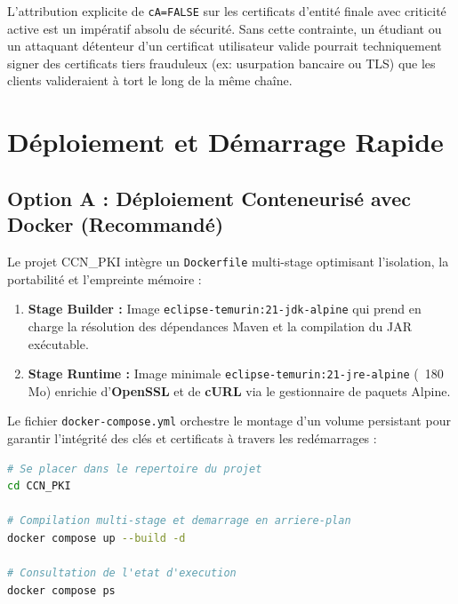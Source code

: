\documentclass[12pt,a4paper]{report}
\begin{document}
\begin{infobox}[title=Importance de l'extension BasicConstraints cA=FALSE]
L'attribution explicite de \texttt{cA=FALSE} sur les certificats d'entité finale avec criticité active est un impératif absolu de sécurité. Sans cette contrainte, un étudiant ou un attaquant détenteur d'un certificat utilisateur valide pourrait techniquement signer des certificats tiers frauduleux (ex: usurpation bancaire ou TLS) que les clients valideraient à tort le long de la même chaîne.
\end{infobox}

\chapter{Déploiement et Démarrage Rapide}

\section{Option A : Déploiement Conteneurisé avec Docker (Recommandé)}
Le projet CCN\_PKI intègre un \texttt{Dockerfile} multi-stage optimisant l'isolation, la portabilité et l'empreinte mémoire :
\begin{enumerate}
    \item \textbf{Stage Builder :} Image \texttt{eclipse-temurin:21-jdk-alpine} qui prend en charge la résolution des dépendances Maven et la compilation du JAR exécutable.
    \item \textbf{Stage Runtime :} Image minimale \texttt{eclipse-temurin:21-jre-alpine} (~180 Mo) enrichie d'\textbf{OpenSSL} et de \textbf{cURL} via le gestionnaire de paquets Alpine.
\end{enumerate}

Le fichier \texttt{docker-compose.yml} orchestre le montage d'un volume persistant pour garantir l'intégrité des clés et certificats à travers les redémarrages :

\begin{lstlisting}[language=bash, caption={Lancement de la PKI via Docker Compose}]
# Se placer dans le repertoire du projet
cd CCN_PKI

# Compilation multi-stage et demarrage en arriere-plan
docker compose up --build -d

# Consultation de l'etat d'execution
docker compose ps
\end{lstlisting}
\end{document}
